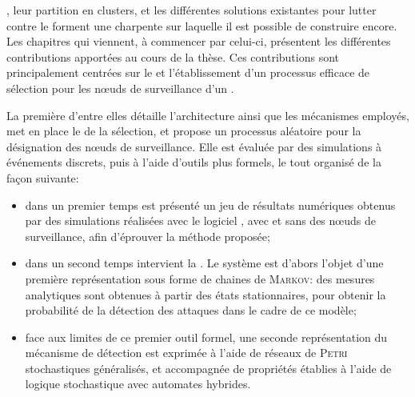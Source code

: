 
, leur partition en clusters, et les différentes solutions existantes pour lutter contre le \dds forment une charpente sur laquelle il est possible de construire encore.
Les chapitres qui viennent, à commencer par celui-ci, présentent les différentes contributions apportées au cours de la thèse.
Ces contributions sont principalement centrées sur le  et l'établissement d'un processus efficace de sélection pour les nœuds de surveillance d'un \rc.

La première d'entre elles détaille l'architecture ainsi que les mécanismes employés, met en place le  de la sélection, et propose un processus aléatoire pour la désignation des nœuds de surveillance.
Elle est évaluée par des simulations à événements discrets, puis à l'aide d'outils plus formels, le tout organisé de la façon suivante:
\begin{itemize}
    \item dans un premier temps est présenté un jeu de résultats numériques obtenus par des simulations réalisées avec le logiciel \nsii, avec et sans  des nœuds de surveillance, afin d'éprouver la méthode proposée;
    \item dans un second temps intervient la . Le système est d'abors l'objet d'une première représentation sous forme de chaines de \textsc{Markov}: des mesures analytiques sont obtenues à partir des états stationnaires, pour obtenir la probabilité de la détection des attaques dans le cadre de ce modèle;
    \item face aux limites de ce premier outil formel, une seconde représentation du mécanisme de détection est exprimée à l'aide de réseaux de \textsc{Petri} stochastiques généralisés, et accompagnée de propriétés établies à l'aide de logique stochastique avec automates hybrides.
\end{itemize}
